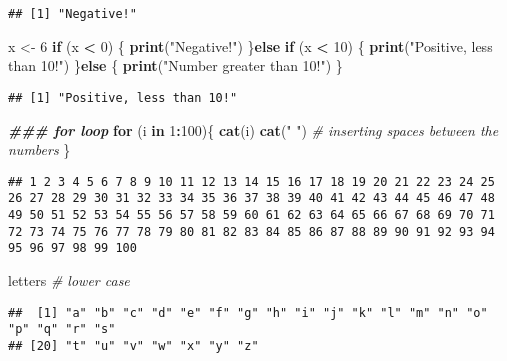 \documentclass[
]{article}
\newenvironment{Shaded}{\begin{snugshade}}{\end{snugshade}}
\newcommand{\CommentTok}[1]{\textcolor[rgb]{0.56,0.35,0.01}{\textit{#1}}}
\newcommand{\ControlFlowTok}[1]{\textcolor[rgb]{0.13,0.29,0.53}{\textbf{#1}}}
\newcommand{\DecValTok}[1]{\textcolor[rgb]{0.00,0.00,0.81}{#1}}
\newcommand{\DocumentationTok}[1]{\textcolor[rgb]{0.56,0.35,0.01}{\textbf{\textit{#1}}}}
\newcommand{\FunctionTok}[1]{\textcolor[rgb]{0.13,0.29,0.53}{\textbf{#1}}}
\newcommand{\NormalTok}[1]{#1}
\newcommand{\OtherTok}[1]{\textcolor[rgb]{0.56,0.35,0.01}{#1}}
\newcommand{\SpecialCharTok}[1]{\textcolor[rgb]{0.81,0.36,0.00}{\textbf{#1}}}
\newcommand{\StringTok}[1]{\textcolor[rgb]{0.31,0.60,0.02}{#1}}
\begin{document}
\begin{verbatim}
## [1] "Negative!"
\end{verbatim}

\begin{Shaded}
\begin{Highlighting}[]
\NormalTok{x }\OtherTok{\textless{}{-}} \DecValTok{6}
\ControlFlowTok{if}\NormalTok{ (x }\SpecialCharTok{\textless{}} \DecValTok{0}\NormalTok{) \{}
\FunctionTok{print}\NormalTok{(}\StringTok{"Negative!"}\NormalTok{)}
\NormalTok{\}}\ControlFlowTok{else} \ControlFlowTok{if}\NormalTok{ (x }\SpecialCharTok{\textless{}} \DecValTok{10}\NormalTok{) \{}
\FunctionTok{print}\NormalTok{(}\StringTok{"Positive, less than 10!"}\NormalTok{)}
\NormalTok{\}}\ControlFlowTok{else}\NormalTok{ \{}
\FunctionTok{print}\NormalTok{(}\StringTok{"Number greater than 10!"}\NormalTok{)}
\NormalTok{\}}
\end{Highlighting}
\end{Shaded}

\begin{verbatim}
## [1] "Positive, less than 10!"
\end{verbatim}

\begin{Shaded}
\begin{Highlighting}[]
\DocumentationTok{\#\#\# for loop}
\ControlFlowTok{for}\NormalTok{ (i }\ControlFlowTok{in} \DecValTok{1}\SpecialCharTok{:}\DecValTok{100}\NormalTok{)\{}
\FunctionTok{cat}\NormalTok{(i)}
\FunctionTok{cat}\NormalTok{(}\StringTok{" "}\NormalTok{) }\CommentTok{\# inserting spaces between the numbers}
\NormalTok{\}}
\end{Highlighting}
\end{Shaded}

\begin{verbatim}
## 1 2 3 4 5 6 7 8 9 10 11 12 13 14 15 16 17 18 19 20 21 22 23 24 25 26 27 28 29 30 31 32 33 34 35 36 37 38 39 40 41 42 43 44 45 46 47 48 49 50 51 52 53 54 55 56 57 58 59 60 61 62 63 64 65 66 67 68 69 70 71 72 73 74 75 76 77 78 79 80 81 82 83 84 85 86 87 88 89 90 91 92 93 94 95 96 97 98 99 100
\end{verbatim}

\begin{Shaded}
\begin{Highlighting}[]
\NormalTok{letters }\CommentTok{\# lower case }
\end{Highlighting}
\end{Shaded}

\begin{verbatim}
##  [1] "a" "b" "c" "d" "e" "f" "g" "h" "i" "j" "k" "l" "m" "n" "o" "p" "q" "r" "s"
## [20] "t" "u" "v" "w" "x" "y" "z"
\end{verbatim}
\end{document}
